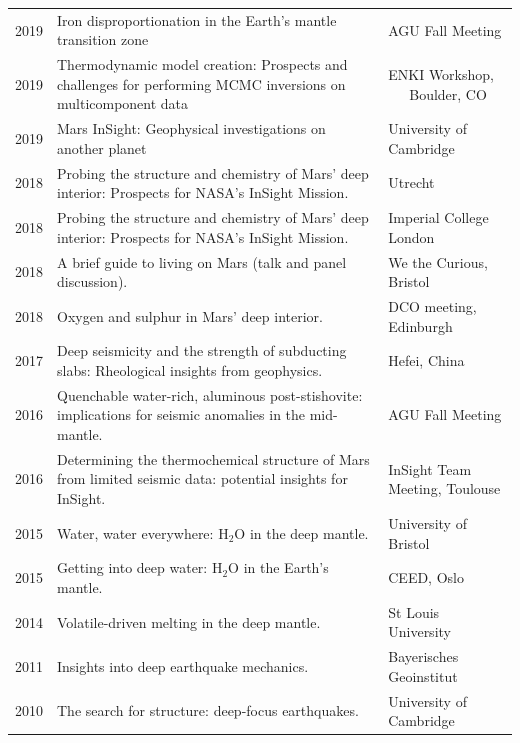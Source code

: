 \documentclass[11pt,twoside,a4paper]{article}
\begin{document}
\vspace{-0.5em}
\begin{table}[!ht]
\centering
\begin{tabular}{L{2cm} L{10cm} L{5cm}}
  2019 \vfill & Iron disproportionation in the Earth's mantle transition zone & AGU Fall Meeting \vfill \\
  2019 \vfill & Thermodynamic model creation: Prospects and challenges for performing MCMC inversions on multicomponent data & ENKI Workshop, \,\,\,\,\,\,\,\,\,Boulder, CO \\
  2019 & Mars InSight: Geophysical investigations on another planet & University of Cambridge \\
2018 \vfill & Probing the structure and chemistry of Mars' deep interior: Prospects for NASA's InSight Mission. & Utrecht \vfill \\
2018 \vfill & Probing the structure and chemistry of Mars' deep interior: Prospects for NASA's InSight Mission. & Imperial College London \vfill \\
2018 & A brief guide to living on Mars (talk and panel discussion). & We the Curious, Bristol \\
2018 & Oxygen and sulphur in Mars' deep interior. & DCO meeting, Edinburgh \\
2017 \vfill & Deep seismicity and the strength of subducting slabs: Rheological insights from geophysics. & Hefei, China \vfill \\
2016 \vfill & Quenchable water-rich, aluminous post-stishovite: implications for seismic anomalies in the mid-mantle. & AGU Fall Meeting \vfill \\
2016 \vfill & Determining the thermochemical structure of Mars from limited seismic data: potential insights for InSight. & InSight Team Meeting, Toulouse\\
2015 & Water, water everywhere: H$_2$O in the deep mantle. & University of Bristol \\
2015 & Getting into deep water: H$_2$O in the Earth's mantle. & CEED, Oslo \\
2014 & Volatile-driven melting in the deep mantle. & St Louis University \\
2011 & Insights into deep earthquake mechanics. & Bayerisches Geoinstitut \\
2010 & The search for structure: deep-focus earthquakes. & University of Cambridge \\
\end{tabular}
\end{table}
\vspace{-1.5em}
\end{document}
